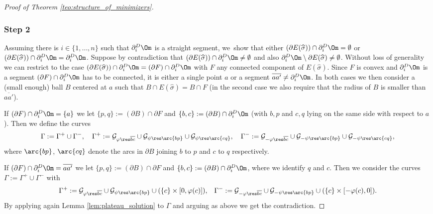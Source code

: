 \begin{proof}[Proof of Theorem \ref{teo:structure_of_minimizers}]
\subsubsection*{Step  2} Assuming there is $i\in\{1,\dots,n\}$ such that $\partial_i^D\Om$ is a straight segment, we~show that either $(\partial E(\widehat\sigma))\cap\partial_i^D\Om=\emptyset$ or $(\partial E(\widehat\sigma))\cap\partial_i^D\Om=\partial_i^D\Om$.
Suppose by contradiction that $(\partial E(\widehat\sigma))\cap\partial_i^D\Om\ne\emptyset$ and also $\partial_i^D\Om\setminus \partial E(\widehat\sigma)\neq \emptyset$. Without loss of generality we can restrict to the case $(\partial E(\widehat\sigma))\cap\partial_i^D\Om=(\partial F)\cap\partial_i^D\Om$ with $F$ any connected component of $E(\widehat\sigma)$. Since $F$ is convex and $\partial_i^D\Om$ is a segment $(\partial F)\cap\partial_i^D\Om$ has to be connected, \ie it is either a single point $a$ or a segment $\overline{aa'}\neq \partial_i^D\Om$.
In both cases we then consider a (small enough) ball $B$ centered at $a$ such that $B\cap E(\widehat\sigma)=B\cap F$ (in the second case we also require that the radius of $B$ is smaller than $\overline{aa'}$).

If $(\partial F)\cap\partial_i^D\Om=\{a\}$ we let $\{p,q\}:=(\partial B)\cap\partial F$ and $\{b,c\}:=(\partial B)\cap\partial_i^D\Om$ (with $b,p$ and $c,q$ lying on the same side with respect to $a$). Then
we define the curves
\begin{equation*}
\Gamma:=\Gamma^+\cup\Gamma^-,\quad \Gamma^+:=\mathcal{G}_{\varphi\res\overline{bc}}\cup \mathcal{G}_{\psi\res\arc{bp}} \cup \mathcal{G}_{\psi\res\arc{cq}},\quad \Gamma^-:=\mathcal{G}_{-\varphi\res\overline{bc}}\cup \mathcal{G}_{-\psi\res\arc{bp}}
\cup \mathcal{G}_{-\psi\res\arc{cq}},
\end{equation*}
where $\arc{bp}$, $\arc{cq}$ denote the arcs in $\partial B$ joining $b$ to $p$ and $c$ to $q$ respectively.

If $(\partial F)\cap\partial_i^D\Om=\overline{aa'}$ we let $\{p,q\}:=(\partial B)\cap\partial F$ and $\{b,c\}:=(\partial B)\cap\partial_i^D\Om$, where we identify $q$ and $c$. Then we consider the curves $\Gamma:=\Gamma^+\cup\Gamma^-$ with
\begin{equation*}
\Gamma^+:=\mathcal{G}_{\varphi\res\overline{bc}}\cup \mathcal{G}_{\psi\res\arc{bp}} \cup (\{c\}\times[0,\varphi(c)]),\quad\! \Gamma^-:=\mathcal{G}_{-\varphi\res\overline{bc}}\cup \mathcal{G}_{-\psi\res\arc{bp}}
\cup (\{c\}\times[-\varphi(c),0]).
\end{equation*}
By applying again Lemma \ref{lem:plateau_solution} to $\Gamma$ and arguing as above we get the contradiction.


\end{proof}
